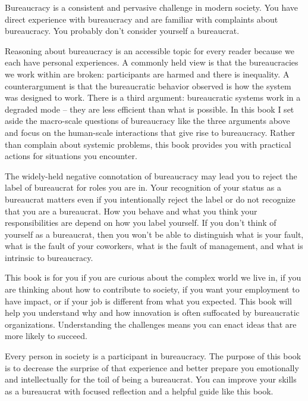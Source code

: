 

Bureaucracy is a consistent and pervasive challenge in modern society. You have direct experience with bureaucracy and are familiar with complaints about bureaucracy. You probably don't consider yourself a bureaucrat.

Reasoning about bureaucracy is an accessible topic for every reader because we each have personal experiences.
A commonly held view is that the bureaucracies we work within are broken: participants are harmed and there is inequality. 
A counterargument is that the bureaucratic behavior observed is how the system was designed to work. There is a third argument: bureaucratic systems work in a degraded mode -- they are less efficient than what is possible. 
In this book I set aside the macro-scale questions of bureaucracy like the three arguments above and focus on the human-scale interactions that give rise to bureaucracy. Rather than complain about systemic problems, this book provides you with practical actions for situations you encounter.

The widely-held negative connotation of bureaucracy may lead you to reject the label of bureaucrat for roles you are in. Your recognition of your status as a bureaucrat matters even if you intentionally reject the label or do not recognize that you are a bureaucrat. How you behave and what you think your responsibilities are depend on how you label yourself.
If you don't think of yourself as a bureaucrat, then you won't be able to distinguish what is your fault, what is the fault of your coworkers, what is the fault of management, and what is intrinsic to bureaucracy. 


This book is for you if you are curious about the complex world we live in,  if you are thinking about how to contribute to society,  if you want your employment to have impact, or if your job is different from what you expected. This book will help you understand why and how innovation is often suffocated by bureaucratic organizations. Understanding the challenges means you can enact ideas that are more likely to succeed.

Every person in society is a participant in bureaucracy. The purpose of this book is to decrease the surprise of that experience and better prepare you emotionally and intellectually for the toil of being a bureaucrat. You can improve your skills as a bureaucrat with focused reflection and a helpful guide like this book. 

